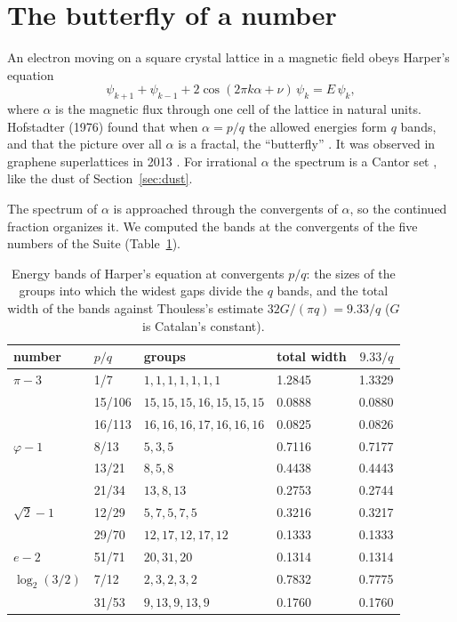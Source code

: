 \section{The butterfly of a number}\label{sec:18butterfly}

An electron moving on a square crystal lattice in a magnetic field obeys Harper's equation
\[
  \psi_{k+1}+\psi_{k-1}+2\cos(2\pi k\alpha+\nu)\,\psi_k=E\,\psi_k ,
\]
where $\alpha$ is the magnetic flux through one cell of the lattice in natural units. Hofstadter (1976)
found that when $\alpha=p/q$ the allowed energies form $q$ bands, and that the picture over all $\alpha$
is a fractal, the ``butterfly'' \cite{hofstadter1976}. It was observed in graphene superlattices in 2013
\cite{dean2013}. For irrational $\alpha$ the spectrum is a Cantor set \cite{avila2009}, like the dust of
Section~\ref{sec:dust}.

The spectrum of $\alpha$ is approached through the convergents of $\alpha$, so the continued fraction
organizes it. We computed the bands at the convergents of the five numbers of the Suite
(Table~\ref{tab:18bands}).

\begin{table}[ht]
\centering
\caption{Energy bands of Harper's equation at convergents $p/q$: the sizes of the groups into which the
widest gaps divide the $q$ bands, and the total width of the bands against Thouless's estimate
$32G/(\pi q)=9.33/q$ ($G$ is Catalan's constant).}\label{tab:18bands}
\small
\begin{tabular}{llllr}
\hline
number & $p/q$ & groups & total width & $9.33/q$\\
\hline
$\pi-3$ & 1/7 & $1,1,1,1,1,1,1$ & 1.2845 & 1.3329\\
 & 15/106 & $15,15,15,16,15,15,15$ & 0.0888 & 0.0880\\
 & 16/113 & $16,16,16,17,16,16,16$ & 0.0825 & 0.0826\\
$\varphi-1$ & 8/13 & $5,3,5$ & 0.7116 & 0.7177\\
 & 13/21 & $8,5,8$ & 0.4438 & 0.4443\\
 & 21/34 & $13,8,13$ & 0.2753 & 0.2744\\
$\sqrt2-1$ & 12/29 & $5,7,5,7,5$ & 0.3216 & 0.3217\\
 & 29/70 & $12,17,12,17,12$ & 0.1333 & 0.1333\\
$e-2$ & 51/71 & $20,31,20$ & 0.1314 & 0.1314\\
$\log_2(3/2)$ & 7/12 & $2,3,2,3,2$ & 0.7832 & 0.7775\\
 & 31/53 & $9,13,9,13,9$ & 0.1760 & 0.1760\\
\hline
\end{tabular}
\end{table}


